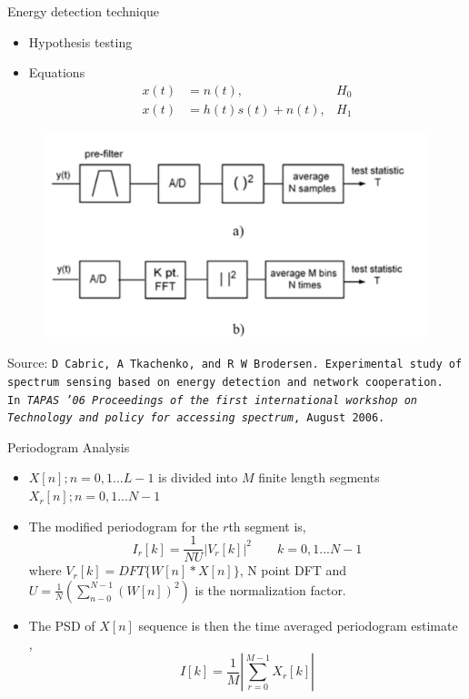 \documentclass{beamer}
\begin{document}
   \begin{frame}{Energy detection technique}
    \begin{minipage}[t][0.8\textheight][t]{\textwidth}
      \begin{itemize}
        \item Hypothesis testing
        \item Equations
          \begin{align}
            x(t) &= n(t), & H_0 \nonumber \\
            x(t) &= h(t)s(t) + n(t), & H_1 \nonumber
          \end{align}
      \end{itemize}
     \begin{figure}
        \centering
        \includegraphics[width=0.59\linewidth]{img/energyDetection}
      \end{figure}
      \tiny{Source: \texttt{D Cabric, A Tkachenko, and R W Brodersen.
      Experimental study of spectrum sensing based on energy detection and network cooperation.\\
      In \emph{TAPAS ’06 Proceedings
of the first international workshop on Technology and policy for accessing spectrum},
August 2006.}}
    \end{minipage}
  \end{frame}

  \begin{frame}{Periodogram Analysis}
    \begin{itemize}
        \item $X[n]; n = 0,1...L-1$ is  divided into $M$ finite length 
        segments $X_{r}[n]; n = 0,1...N-1 $
        \item The modified periodogram for the $r$th segment is,
          \begin{equation*}
              I_{r}[k] = \frac{1}{NU} \left| V_{r}[k]\right|^2     \qquad k = 0,1...N-1 
          \end{equation*}
          where $V_{r}[k] = DFT\{W[n]*X[n]\}$, N point DFT
          and $U = \frac{1}{N}(\sum_{n-0}^{N-1} (W[n])^2)$ is the normalization factor. 
        \item The PSD of $X[n]$ sequence 
          is then the time averaged periodogram estimate ,
          \begin{equation*}
              I[k] = \frac{1}{M}\left|\sum_{r=0}^{M-1}X_{r}[k]\right|
          \end{equation*}
    \end{itemize}
  \end{frame}
\end{document}
